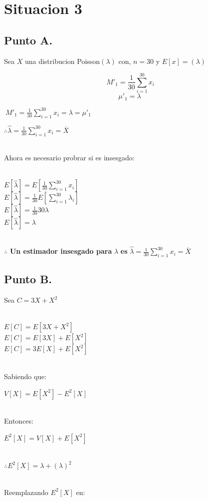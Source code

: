 \documentclass[letterpaper,12pt,onecolumn,titlepage]{article}
\begin{document}
\section{Situacion 3}
\subsection{Punto A.}

Sea $X$ una distribucion Poisson$(\lambda)$ con, $n=30$ y $E[x]=(\lambda)$

$$\ M'_1 = \frac{1}{30} \sum_{i=1}^{30}x_{i}$$
$$\mu'_1 = \lambda$$

$\ M'_1 = \frac{1}{30} \sum_{i=1}^{30}x_{i} = \lambda = \mu'_1$

$\therefore \hat{\lambda}= \frac{1}{30} \sum_{i=1}^{30}x_{i} = \overline{X}$
 
~\\Ahora es necesario probrar si es insesgado: 

~\\$E[\hat{\lambda}]=E[\frac{1}{30} \sum_{i=1}^{30}x_{i}]$
~\\$E[\hat{\lambda}]=\frac{1}{30} E[\sum_{i=1}^{30}{\lambda}_{i}]$
~\\$E[\hat{\lambda}]=\frac{1}{30}30\lambda$
~\\$E[\hat{\lambda}]=\lambda$

~\\$\therefore$ \textbf{Un estimador insesgado para} $\lambda$ \textbf{es} $\hat{\lambda}= \frac{1}{30} \sum_{i=1}^{30}x_{i} = \overline{X}$

\subsection{Punto B.}

Sea $C=3X+X^2$

~\\$E[C]=E[3X+X^2]$
~\\$E[C]=E[3X] + E[X^2]$
~\\$E[C]=3E[X] + E[X^2]$

~\\ Sabiendo que:
 
$V[X]=E[X^2] - E^2[X]$


~\\ Entonces: 

$E^2[X] = V[X] + E[X^2]$

~\\$\therefore E^2[X] = \lambda + (\lambda)^2$

~\\ Reemplazando $E^2[X]$ en:\ 
\end{document}
